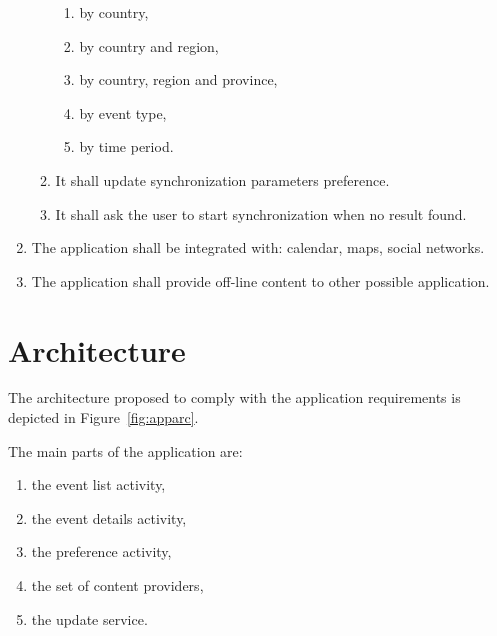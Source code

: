\documentclass[12pt, twoside]{article}
\begin{document}
\begin{enumerate}
\begin{enumerate}
			\begin{enumerate}
				\item by country,
				\item	by country and region,
				\item	by country, region and province,
				\item by event type,
				\item by time period.
			\end{enumerate}
			\item It shall update synchronization parameters preference.
			\item	It shall ask the user to start synchronization when no result found.
    		\end{enumerate}
    	\item The application shall be integrated with: calendar, maps, social networks.
    	\item The application shall provide off-line content to other possible application.
\end{enumerate}

\section{Architecture}

The architecture proposed to comply with the application requirements
is depicted in Figure~\ref{fig:apparc}. 

The main parts of the application are:
\begin{enumerate}
	\item	the event list activity,
	\item	the event details activity,
	\item	the preference activity,
	\item	the set of content providers,
	\item	the update service.
\end{enumerate}
\end{document}
